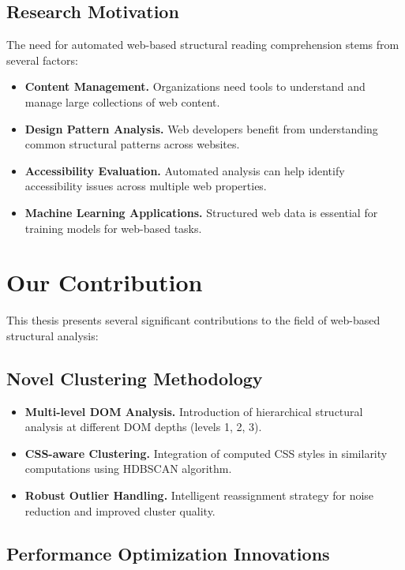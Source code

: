\subsection{Research Motivation}

The need for automated web-based structural reading comprehension stems from several factors:

\begin{itemize}
\item \textbf{Content Management.} Organizations need tools to understand and manage large collections of web content.
\item \textbf{Design Pattern Analysis.} Web developers benefit from understanding common structural patterns across websites.
\item \textbf{Accessibility Evaluation.} Automated analysis can help identify accessibility issues across multiple web properties.
\item \textbf{Machine Learning Applications.} Structured web data is essential for training models for web-based tasks.
\end{itemize}

\section{Our Contribution}
\label{sec:contribution}

This thesis presents several significant contributions to the field of web-based structural analysis:

\subsection{Novel Clustering Methodology}

\begin{itemize}
\item \textbf{Multi-level DOM Analysis.} Introduction of hierarchical structural analysis at different DOM depths (levels 1, 2, 3).
\item \textbf{CSS-aware Clustering.} Integration of computed CSS styles in similarity computations using HDBSCAN algorithm.
\item \textbf{Robust Outlier Handling.} Intelligent reassignment strategy for noise reduction and improved cluster quality.
\end{itemize}

\subsection{Performance Optimization Innovations}

